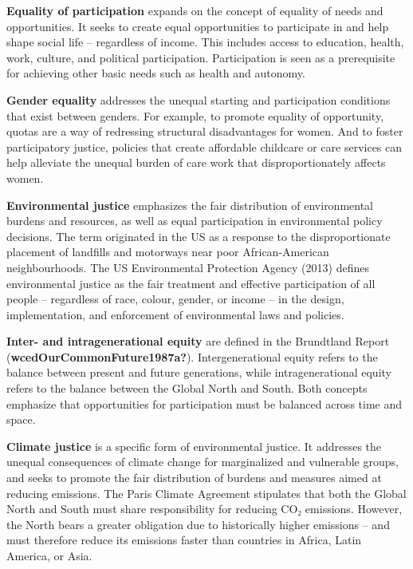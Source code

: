 \documentclass[
  a4paper,
  DIV=11,
  numbers=noendperiod,
  oneside,
  openany]{scrreprt}
\begin{document}
\begin{tcolorbox}
\textbf{Equality of participation} expands on the concept of equality of
needs and opportunities. It seeks to create equal opportunities to
participate in and help shape social life -- regardless of income. This
includes access to education, health, work, culture, and political
participation. Participation is seen as a prerequisite for achieving
other basic needs such as health and autonomy.

\textbf{Gender equality} addresses the unequal starting and
participation conditions that exist between genders. For example, to
promote equality of opportunity, quotas are a way of redressing
structural disadvantages for women. And to foster participatory justice,
policies that create affordable childcare or care services can help
alleviate the unequal burden of care work that disproportionately
affects women.

\textbf{Environmental justice} emphasizes the fair distribution of
environmental burdens and resources, as well as equal participation in
environmental policy decisions. The term originated in the US as a
response to the disproportionate placement of landfills and motorways
near poor African-American neighbourhoods. The US Environmental
Protection Agency (2013) defines environmental justice as the fair
treatment and effective participation of all people -- regardless of
race, colour, gender, or income -- in the design, implementation, and
enforcement of environmental laws and policies.

\textbf{Inter- and intragenerational equity} are defined in the
Brundtland Report (\textbf{wcedOurCommonFuture1987a?}).
Intergenerational equity refers to the balance between present and
future generations, while intragenerational equity refers to the balance
between the Global North and South. Both concepts emphasize that
opportunities for participation must be balanced across time and space.

\textbf{Climate justice} is a specific form of environmental justice. It
addresses the unequal consequences of climate change for marginalized
and vulnerable groups, and seeks to promote the fair distribution of
burdens and measures aimed at reducing emissions. The Paris Climate
Agreement stipulates that both the Global North and South must share
responsibility for reducing CO₂ emissions. However, the North bears a
greater obligation due to historically higher emissions -- and must
therefore reduce its emissions faster than countries in Africa, Latin
America, or Asia.

\end{tcolorbox}
\end{document}
